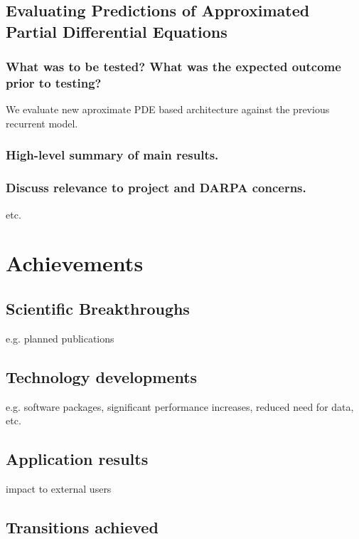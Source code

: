 \documentclass[12pt]{article}
\theoremstyle{plain}
\theoremstyle{remark}
\theoremstyle{definition}
\begin{document}
\subsection{Evaluating Predictions of Approximated Partial Differential Equations}

\subsubsection{What was to be tested? What was the expected outcome prior to testing?}
We evaluate new aproximate PDE based architecture against the previous recurrent model. 

\subsubsection{High-level summary of main results.}

\subsubsection{Discuss relevance to project and DARPA concerns.}

etc.

\section{Achievements}

\subsection{Scientific Breakthroughs}

e.g. planned publications

\subsection{Technology developments}

e.g. software packages, significant performance increases, reduced need for data, etc.

\subsection{Application results}

impact to external users

\subsection{Transitions achieved}
\end{document}

